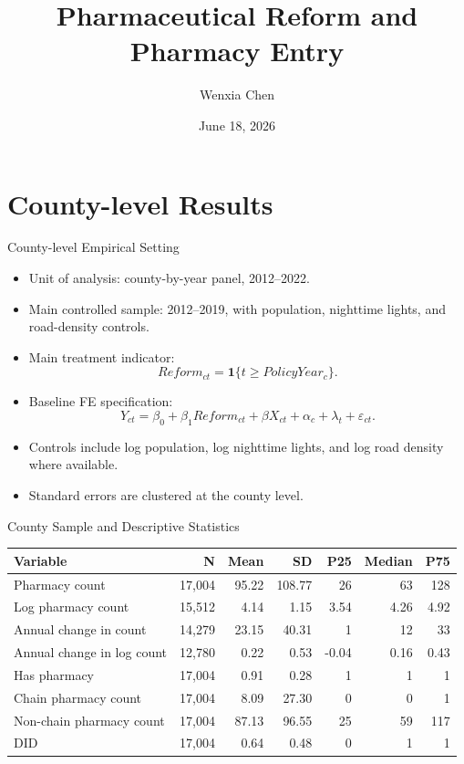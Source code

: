 \documentclass{beamer}
\title{Pharmaceutical Reform and Pharmacy Entry}
\subtitle{}
\author{Wenxia Chen}
\date{June 18, 2026}
\begin{document}
\frame{\titlepage}


\section{County-level Results}

\begin{frame}{County-level Empirical Setting}

\small
\begin{itemize}\setlength\itemsep{0.65em}
    \item Unit of analysis: county-by-year panel, 2012--2022.
    \item Main controlled sample: 2012--2019, with population, nighttime lights, and road-density controls.
    \item Main treatment indicator:
    \[
        Reform_{ct}=\mathbf{1}\{t\geq PolicyYear_c\}.
    \]
    \item Baseline FE specification:
    \[
        Y_{ct}=\beta_0+\beta_1 Reform_{ct}+\beta X_{ct}+\alpha_c+\lambda_t+\varepsilon_{ct}.
    \]
    \item Controls include log population, log nighttime lights, and log road density where available.
    \item Standard errors are clustered at the county level.
\end{itemize}

\end{frame}

\begin{frame}{County Sample and Descriptive Statistics}

\centering
\scriptsize
\setlength{\tabcolsep}{4.5pt}

\begin{tabular}{lrrrrrr}
\toprule
Variable & N & Mean & SD & P25 & Median & P75 \\
\midrule
Pharmacy count & 17,004 & 95.22 & 108.77 & 26 & 63 & 128 \\
Log pharmacy count & 15,512 & 4.14 & 1.15 & 3.54 & 4.26 & 4.92 \\
Annual change in count & 14,279 & 23.15 & 40.31 & 1 & 12 & 33 \\
Annual change in log count & 12,780 & 0.22 & 0.53 & -0.04 & 0.16 & 0.43 \\
Has pharmacy & 17,004 & 0.91 & 0.28 & 1 & 1 & 1 \\
Chain pharmacy count & 17,004 & 8.09 & 27.30 & 0 & 0 & 1 \\
Non-chain pharmacy count & 17,004 & 87.13 & 96.55 & 25 & 59 & 117 \\
DID & 17,004 & 0.64 & 0.48 & 0 & 1 & 1 \\
\bottomrule
\end{tabular}


\end{frame}
\end{document}
